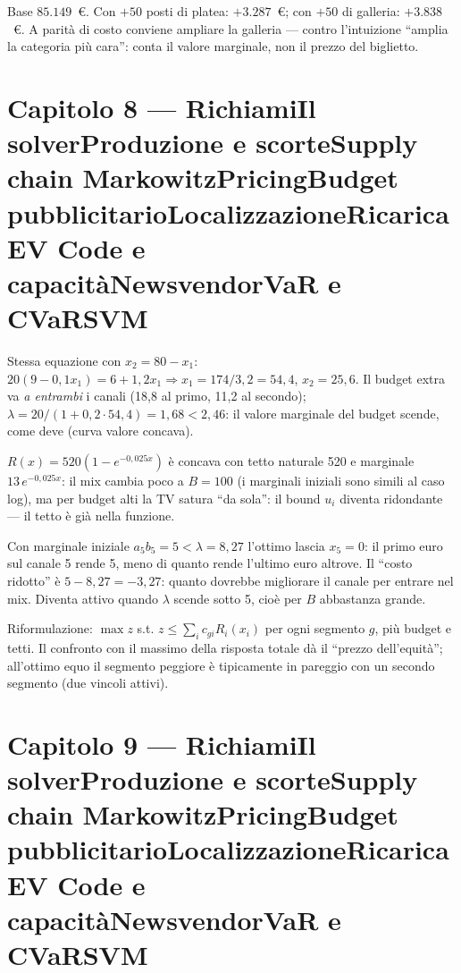 \documentclass[11pt,a4paper]{article}
\newcounter{cap}
\newcounter{sol}[cap]
\newcommand{\capitolo}[1]{\setcounter{cap}{#1}\section*{Capitolo #1 --- \capnome{#1}}}
\newcommand{\capnome}[1]{%
  \ifcase#1\or\or Richiami\or Il solver\or Produzione e scorte\or Supply chain\or
  Markowitz\or Pricing\or Budget pubblicitario\or Localizzazione\or Ricarica EV\or
  Code e capacità\or Newsvendor\or VaR e CVaR\or SVM\fi}
\begin{document}
\begin{soluzione}[multiprodotto]
Base $85.149$~\euro. Con $+50$ posti di platea: $+3.287$~\euro; con $+50$ di
galleria: $+3.838$~\euro. A parità di costo conviene ampliare la galleria ---
contro l'intuizione ``amplia la categoria più cara'': conta il valore marginale,
non il prezzo del biglietto.
\end{soluzione}

\capitolo{8}

\begin{soluzione}[verifica]
Stessa equazione con $x_2 = 80 - x_1$: $20(9 - 0{,}1x_1) = 6 + 1{,}2x_1
\Rightarrow x_1 = 174/3{,}2 = 54{,}4$, $x_2 = 25{,}6$. Il budget extra va
\emph{a entrambi} i canali (18{,}8 al primo, 11{,}2 al secondo);
$\lambda = 20/(1 + 0{,}2 \cdot 54{,}4) = 1{,}68 < 2{,}46$: il valore marginale del
budget scende, come deve (curva valore concava).
\end{soluzione}

\begin{soluzione}
$R(x) = 520(1 - e^{-0{,}025x})$ è concava con tetto naturale 520 e marginale
$13\,e^{-0{,}025x}$: il mix cambia poco a $B = 100$ (i marginali iniziali sono
simili al caso log), ma per budget alti la TV satura ``da sola'': il bound $u_i$
diventa ridondante --- il tetto è già nella funzione.
\end{soluzione}

\begin{soluzione}
Con marginale iniziale $a_5 b_5 = 5 < \lambda = 8{,}27$ l'ottimo lascia $x_5 = 0$:
il primo euro sul canale 5 rende 5, meno di quanto rende l'ultimo euro altrove. Il
``costo ridotto'' è $5 - 8{,}27 = -3{,}27$: quanto dovrebbe migliorare il canale
per entrare nel mix. Diventa attivo quando $\lambda$ scende sotto 5, cioè per
$B$ abbastanza grande.
\end{soluzione}

\begin{soluzione}
Riformulazione: $\max z$ s.t. $z \le \sum_i c_{gi} R_i(x_i)$ per ogni segmento $g$,
più budget e tetti. Il confronto con il massimo della risposta totale dà il ``prezzo
dell'equità''; all'ottimo equo il segmento peggiore è tipicamente in pareggio con un
secondo segmento (due vincoli attivi).
\end{soluzione}

\capitolo{9}
\end{document}
